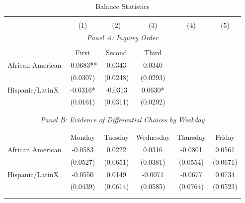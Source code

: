                   \begin{table}[H]                 \scriptsize \centering                 \begin{threeparttable}                 \captionsetup{justification=centering}                 \caption{Balance Statistics}                 \label{tab:balance}                  \begin{tabular}{@{\extracolsep{5pt}}lccccc}                 \\[-1.8ex]\hline                 \hline \\[-1.8ex]                  &  (1) & (2) & (3) & (4) & (5) \\                  \cline{2-6}                  \multicolumn{6}{c}{\textit{Panel A: {\it  Inquiry Order}}} \\                  \hline \\[-1.8ex]                   & First & Second & Third & & \\        
\hline
African American    &     -0.0683** &      0.0343   &      0.0340   \\
                    &    (0.0307)   &    (0.0248)   &    (0.0293)   \\
Hispanic/LatinX     &     -0.0316*  &     -0.0313   &      0.0630*  \\
                    &    (0.0161)   &    (0.0311)   &    (0.0292)   \\
             \\[-1.8ex]\hline        \hline \\[-1.8ex] 
                 \multicolumn{6}{c}{\textit{Panel B: Evidence of Differential Choices by Weekday}} \\                \hline \\[-1.8ex]                \\[-1.8ex] & Monday & Tuesday & Wednesday & Thursday & Friday \\         
\hline
African American    &     -0.0583   &      0.0222   &      0.0316   &     -0.0801   &      0.0561   \\
                    &    (0.0527)   &    (0.0651)   &    (0.0381)   &    (0.0554)   &    (0.0671)   \\
Hispanic/LatinX     &     -0.0550   &      0.0149   &     -0.0071   &     -0.0677   &      0.0734   \\
                    &    (0.0439)   &    (0.0614)   &    (0.0585)   &    (0.0764)   &    (0.0523)   \\
             \\[-1.8ex]\hline        \hline \\[-1.8ex] 

\end{tabular}
\end{threeparttable}
\end{table}
